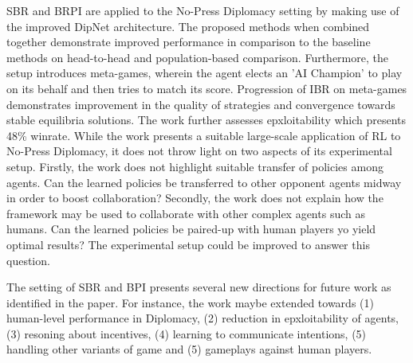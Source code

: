 \documentclass[11pt,letterpaper]{article}
\begin{document}
SBR and BRPI are applied to the No-Press Diplomacy setting by making use of the improved DipNet architecture. The proposed methods when combined together demonstrate improved performance in comparison to the baseline methods on head-to-head and population-based comparison. Furthermore, the setup introduces meta-games, wherein the agent elects an 'AI Champion' to play on its behalf and then tries to match its score. Progression of IBR on meta-games demonstrates improvement in the quality of strategies and convergence towards stable equilibria solutions. The work further assesses epxloitability which presents 48\% winrate. While the work presents a suitable large-scale application of RL to No-Press Diplomacy, it does not throw light on two aspects of its experimental setup. Firstly, the work does not highlight suitable transfer of policies among agents. Can the learned policies be transferred to other opponent agents midway in order to boost collaboration? Secondly, the work does not explain how the framework may be used to collaborate with other complex agents such as humans. Can the learned policies be paired-up with human players yo yield optimal results? The experimental setup could be improved to answer this question.

The setting of SBR and BPI presents several new directions for future work as identified in the paper. For instance, the work maybe extended towards (1) human-level performance in Diplomacy, (2) reduction in epxloitability of agents, (3) resoning about incentives, (4) learning to communicate intentions, (5) handling other variants of game and (5) gameplays against human players. 
\end{document}
